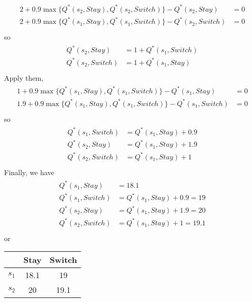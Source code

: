 \documentclass{myhw}
\begin{document}
\begin{homeworkProblem}
\begin{homeworkSection}
\begin{gather*}
\begin{aligned}
2 + 0.9 \max \{Q^*(s_2,Stay),Q^*(s_2,Switch)\} - Q^*(s_2, Stay) &= 0 \\
2 + 0.9 \max \{Q^*(s_1,Stay),Q^*(s_1,Switch)\} - Q^*(s_2, Switch) &= 0 \\
\end{aligned}
\end{gather*}
so
\begin{gather*}
\begin{aligned}
Q^*(s_2,Stay) &= 1 + Q^*(s_1,Switch) \\
Q^*(s_2,Switch) &= 1 + Q^*(s_1,Stay) \\
\end{aligned}
\end{gather*}
Apply them,
\begin{gather*}
\begin{aligned}
1 + 0.9 \max \{Q^*(s_1,Stay),Q^*(s_1,Switch)\} - Q^*(s_1, Stay) &= 0 \\
1.9 + 0.9 \max \{Q^*(s_1,Stay),Q^*(s_1,Switch)\} - Q^*(s_1, Switch) &= 0 \\
\end{aligned}
\end{gather*}
so
\begin{gather*}
\begin{aligned}
Q^*(s_1,Switch) &= Q^*(s_1,Stay) + 0.9 \\ 
Q^*(s_2,Stay) &= Q^*(s_1,Stay) + 1.9 \\ 
Q^*(s_2,Switch) &= Q^*(s_1,Stay) + 1 \\ 
\end{aligned}
\end{gather*}
Finally, we have
\begin{gather*}
\begin{aligned}
Q^*(s_1,Stay) &= 18.1 \\
Q^*(s_1,Switch) &= Q^*(s_1,Stay) + 0.9 = 19 \\ 
Q^*(s_2,Stay) &= Q^*(s_1,Stay) + 1.9 = 20 \\ 
Q^*(s_2,Switch) &= Q^*(s_1,Stay) + 1 = 19.1 \\ 
\end{aligned}
\end{gather*}
or
\begin{center}
\begin{tabular}{c|c|c}
  & Stay & Switch \\ 
 \hline
 $s_1$ & 18.1 & 19 \\  
 \hline
 $s_2$ & 20 & 19.1    
\end{tabular}
\end{center}

\end{homeworkSection}
\end{homeworkProblem}
\end{document}
